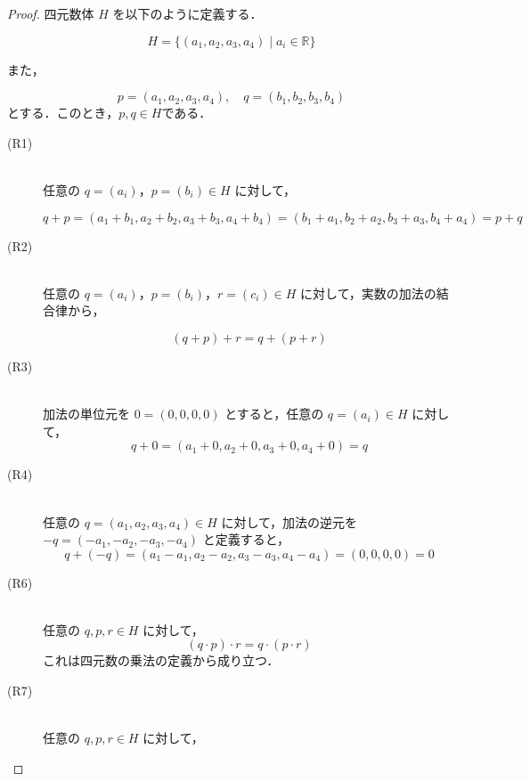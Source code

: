 \documentclass[a4paper,10pt,fleqn]{ltjsarticle}
\begin{document}
\begin{leftbar}
    \begin{proof}
        四元数体 $H$ を以下のように定義する．

        \[
            H = \{ (a_1, a_2, a_3, a_4) \mid a_i \in \mathbb{R}\}
        \]

        また，

        \[
            p=(a_1, a_2, a_3, a_4),\quad q=(b_1, b_2, b_3, b_4)
        \]
        とする．このとき，$ p ,q \in H$である．
        \begin{description}
            \item [(R1)] \mbox{} \\
                  任意の $q = (a_i)$，$p = (b_i) \in H$ に対して，

                  \[
                      q + p = (a_1 + b_1, a_2 + b_2, a_3 + b_3, a_4 + b_4) = (b_1 + a_1, b_2 + a_2, b_3 + a_3, b_4 + a_4) = p + q
                  \]
            \item [(R2)] \mbox{} \\
                  任意の $q = (a_i)$，$p = (b_i)$，$r = (c_i) \in H$ に対して，実数の加法の結合律から，

                  \[
                      (q + p) + r = q + (p + r)
                  \]
            \item [(R3)] \mbox{} \\
                  加法の単位元を $0 = (0, 0, 0, 0)$ とすると，任意の $q = (a_i) \in H$ に対して，
                  \[
                      q + 0 = (a_1 + 0, a_2 + 0, a_3 + 0, a_4 + 0) = q
                  \]

            \item [(R4)] \mbox{} \\
                  任意の $q = (a_1, a_2, a_3, a_4) \in H$ に対して，加法の逆元を $-q = (-a_1, -a_2, -a_3, -a_4)$ と定義すると，
                  \[
                      q + (-q) = (a_1 - a_1, a_2 - a_2, a_3 - a_3, a_4 - a_4) = (0, 0, 0, 0) = 0
                  \]
            \item [(R6)] \mbox{} \\
                  任意の $q, p, r \in H$ に対して，
                  \[
                      (q \cdot p) \cdot r = q \cdot (p \cdot r)
                  \]
                  これは四元数の乗法の定義から成り立つ．
            \item[(R7)] \mbox{} \\
                  任意の $q, p, r \in H$ に対して，


\end{description}
\end{proof}
\end{leftbar}
\end{document}
